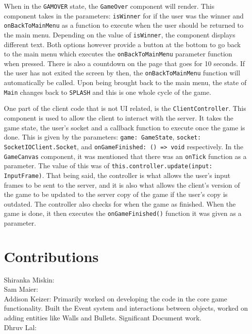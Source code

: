 \documentclass[12pt]{report}
\begin{document}
When in the \texttt{GAMOVER} state, the \texttt{GameOver} component will render. This component takes in the parameters: \texttt{isWinner} for if the user was the winner and \texttt{onBackToMainMenu} as a function to execute when the user should be returned to the main menu. Depending on the value of \texttt{isWinner}, the component displays different text. Both options however provide a button at the bottom to go back to the main menu which executes the \texttt{onBackToMainMenu} parameter function when pressed. There is also a countdown on the page that goes for 10 seconds. If the user has not exited the screen by then, the \texttt{onBackToMainMenu} function will automatically be called. Upon being brought back to the main menu, the state of \texttt{Main} changes back to \texttt{SPLASH} and this is one whole cycle of the game.


One part of the client code that is not UI related, is the \texttt{ClientController}. This component is used to allow the client to interact with the server. It takes the game state, the user's socket and a callback function to execute once the game is done. This is given by the parameters: \texttt{game: GameState}, \texttt{socket: SocketIOClient.Socket}, and \texttt{onGameFinished: () => void} respectively. In the \texttt{GameCanvas} component, it was mentioned that there was an \texttt{onTick} function as a parameter. The value of this was of \texttt{this.controller.update(input: InputFrame)}. That being said, the controller is what allows the user's input frames to be sent to the server, and it is also what allows the client's version of the game to be updated to the server copy of the game if the user's copy is outdated. The controller also checks for when the game as finished. When the game is done, it then executes the \texttt{onGameFinished()} function it was given as a parameter.

\chapter{Contributions}

Shiranka Miskin: \\
Sam Maier: \\
Addison Keizer: Primarily worked on developing the code in the core game functionality. Built the Event system and interactions between objects, worked on adding entities like Walls and Bullets. Significant Document work. \\
Dhruv Lal: \\
\end{document}
